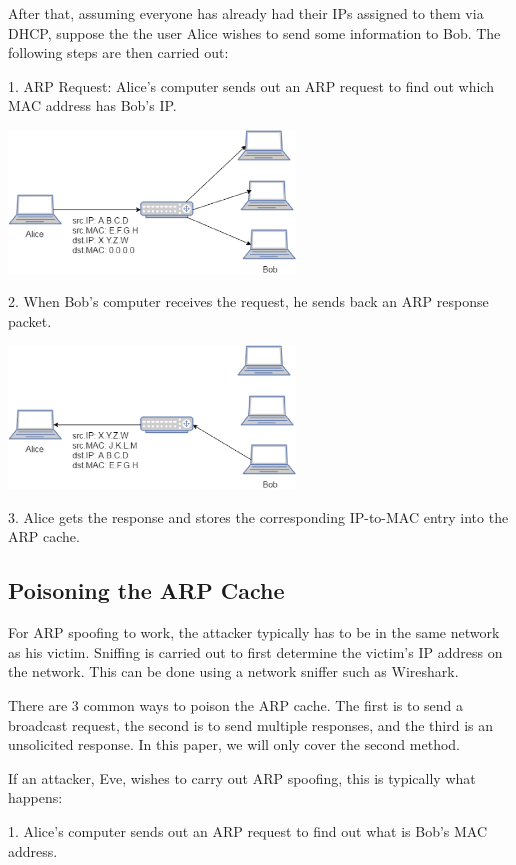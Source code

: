 \documentclass{acm_proc_article-sp}
\begin{document}
\newpage

After that, assuming everyone has already had their IPs assigned to them via DHCP, suppose the the user Alice wishes to send some information to Bob. The following steps are then carried out: 

1. ARP Request: Alice's computer sends out an ARP request to find out which MAC address has Bob's IP. 

\includegraphics[width=3in]{ARP_Request.eps}

2. When Bob's computer receives the request, he sends back an ARP response packet. 

\includegraphics[width=3in]{ARP_Response.eps}

3. Alice gets the response and stores the corresponding IP-to-MAC entry into the ARP cache. 


\subsection{Poisoning the ARP Cache}
For ARP spoofing to work, the attacker typically has to be in the same network as his victim\cite{blackhat:arp5}. Sniffing is carried out to first determine the victim's IP address on the network. This can be done using a network sniffer such as Wireshark.  

There are 3 common ways to poison the ARP cache. The first is to send a broadcast request, the second is to send multiple responses, and the third is an unsolicited response. In this paper, we will only cover the second method\cite{wagner:arp4}.

If an attacker, Eve, wishes to carry out ARP spoofing, this is typically what happens: 

1. Alice's computer sends out an ARP request to find out what is Bob's MAC address. 
\end{document}
